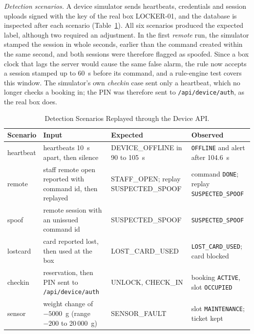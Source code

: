 \documentclass[journal,onecolumn]{IEEEtran}
\begin{document}
\textit{Detection scenarios.} A device simulator sends heartbeats, credentials and session uploads signed with the key
of the real box LOCKER-01, and the database is inspected after each scenario (Table~\ref{tab:scen}). All six scenarios
produced the expected label, although two required an adjustment. In the first \emph{remote} run, the simulator
stamped the session in whole seconds, earlier than the command created within the same second, and both sessions were
therefore flagged as spoofed. Since a box clock that lags the server would cause the same false alarm, the rule now
accepts a session stamped up to 60~s before its command, and a rule-engine test covers this window. The simulator's
own \emph{checkin} case sent only a heartbeat, which no longer checks a booking in; the PIN was therefore sent to
\texttt{/api/device/auth}, as the real box does.

\begin{table}[!htbp]
\renewcommand{\arraystretch}{1.12}
\centering
\small
\caption{Detection Scenarios Replayed through the Device API.}
\label{tab:scen}
\vspace{3pt}
\begin{tabular}{l >{\raggedright\arraybackslash}p{4.8cm} >{\raggedright\arraybackslash}p{3.6cm} >{\raggedright\arraybackslash}p{5.2cm}}
\hline
Scenario & Input & Expected & Observed \\
\midrule
\addlinespace[2pt]
heartbeat & 6 heartbeats 10~s apart, then silence & DEVICE\_OFFLINE in 90 to 105~s & \texttt{OFFLINE} and alert after 104.6~s \\[2pt]
remote    & staff remote open reported with command id, then replayed & STAFF\_OPEN; replay SUSPECTED\_SPOOF & command \texttt{DONE}; replay \texttt{SUSPECTED\_SPOOF} \\[2pt]
spoof     & remote session with an unissued command id & SUSPECTED\_SPOOF & \texttt{SUSPECTED\_SPOOF} \\[2pt]
lostcard  & card reported lost, then used at the box & LOST\_CARD\_USED & \texttt{LOST\_CARD\_USED}; card blocked \\[2pt]
checkin   & reservation, then PIN sent to \texttt{/api/device/auth} & UNLOCK, CHECK\_IN & booking \texttt{ACTIVE}, slot \texttt{OCCUPIED} \\[2pt]
sensor    & weight change of $-5000$~g (range $-200$ to 20\,000~g) & SENSOR\_FAULT & slot \texttt{MAINTENANCE}; ticket kept \\
\hline
\end{tabular}
\end{table}
\end{document}

